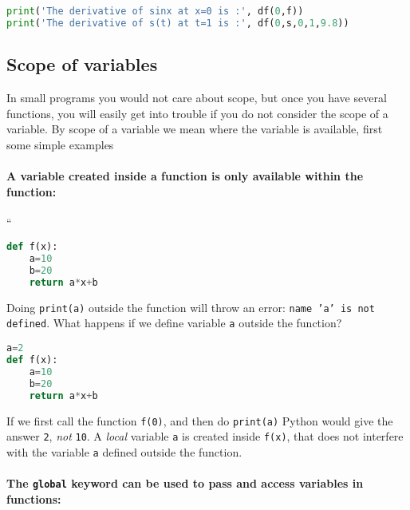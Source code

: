 \documentclass[graybox,sectrefs,envcountresetchap,open=right,final]{svmonodo}
\begin{document}
\begin{lstlisting}[language=python,style=blue1bar]
print('The derivative of sinx at x=0 is :', df(0,f))
print('The derivative of s(t) at t=1 is :', df(0,s,0,1,9.8))

\end{lstlisting}


\subsection{Scope of variables}
In small programs you would not care about scope, but once you have several functions, you will easily get into trouble if you do not consider the scope of a variable. By scope of a variable we mean where the variable is available, first some simple examples

\paragraph{A variable created inside a function is only available within the function:}
``






\begin{lstlisting}[language=python,style=blue1bar]
def f(x):
    a=10
    b=20
    return a*x+b

\end{lstlisting}

Doing \texttt{print(a)} outside the function will throw an error: \texttt{name 'a' is not defined}. What happens if we define variable \texttt{a} outside the function?






\begin{lstlisting}[language=python,style=blue1bar]
a=2
def f(x):
    a=10
    b=20
    return a*x+b

\end{lstlisting}

If we first call the function \texttt{f(0)}, and then do \texttt{print(a)} Python would give the answer \texttt{2}, \emph{not} \texttt{10}. A \emph{local} variable \texttt{a} is created inside \texttt{f(x)}, that does not interfere with the variable \texttt{a} defined outside the function.

\paragraph{The \texttt{global} keyword can be used to pass and access variables in functions:}
\end{document}
